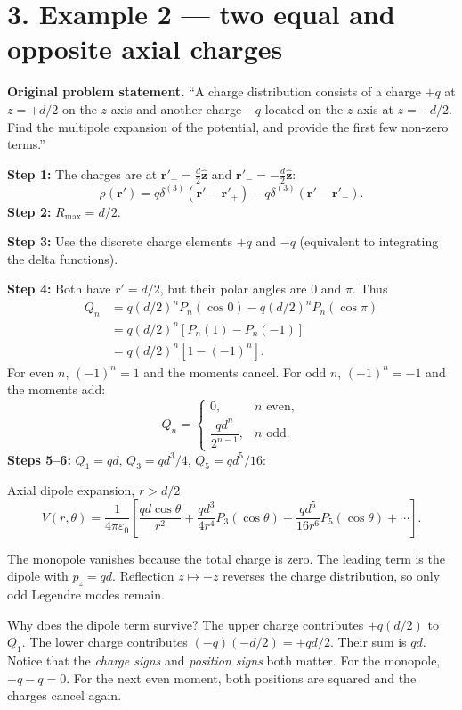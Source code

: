 \documentclass[10pt,letterpaper]{article}
\newcommand{\eps}{\varepsilon_0}\newcommand{\dd}{\mathrm d}
\begin{document}
\section*{3. Example 2 --- two equal and opposite axial charges}
\textbf{Original problem statement.} ``A charge distribution consists of a charge $+q$ at $z=+d/2$ on the $z$-axis and another charge $-q$ located on the $z$-axis at $z=-d/2$. Find the multipole expansion of the potential, and provide the first few non-zero terms.''

\begin{center}\end{center}
\textbf{Step 1:} The charges are at $\mathbf r'_+=\tfrac d2\hat{\mathbf z}$ and $\mathbf r'_-=-\tfrac d2\hat{\mathbf z}$:
\[\rho(\mathbf r')=q\delta^{(3)}(\mathbf r'-\mathbf r'_+)-q\delta^{(3)}(\mathbf r'-\mathbf r'_-).\]
\textbf{Step 2:} $R_{\max}=d/2$.

\textbf{Step 3:} Use the discrete charge elements $+q$ and $-q$ (equivalent to integrating the delta functions).

\textbf{Step 4:} Both have $r'=d/2$, but their polar angles are $0$ and $\pi$. Thus
\begin{align*}Q_n&=q(d/2)^nP_n(\cos0)-q(d/2)^nP_n(\cos\pi)\\
&=q(d/2)^n[P_n(1)-P_n(-1)]\\
&=q(d/2)^n[1-(-1)^n].\end{align*}
For even $n$, $(-1)^n=1$ and the moments cancel. For odd $n$, $(-1)^n=-1$ and the moments add:
\[\boxed{Q_n=\begin{cases}0,&n\text{ even},\\\dfrac{qd^n}{2^{n-1}},&n\text{ odd}.\end{cases}}\]
\textbf{Steps 5--6:} $Q_1=qd$, $Q_3=qd^3/4$, $Q_5=qd^5/16$:
\begin{result}{Axial dipole expansion, $r>d/2$}
\[\boxed{V(r,\theta)=\frac{1}{4\pi\eps}\left[\frac{qd\cos\theta}{r^2}+\frac{qd^3}{4r^4}P_3(\cos\theta)+\frac{qd^5}{16r^6}P_5(\cos\theta)+\cdots\right].}\]
\end{result}
The monopole vanishes because the total charge is zero. The leading term is the dipole with $p_z=qd$. Reflection $z\mapsto-z$ reverses the charge distribution, so only odd Legendre modes remain.
\begin{insight}{Why does the dipole term survive?}
The upper charge contributes $+q(d/2)$ to $Q_1$. The lower charge contributes $(-q)(-d/2)=+qd/2$. Their sum is $qd$. Notice that the \emph{charge signs} and \emph{position signs} both matter. For the monopole, $+q-q=0$. For the next even moment, both positions are squared and the charges cancel again.
\end{insight}
\end{document}
